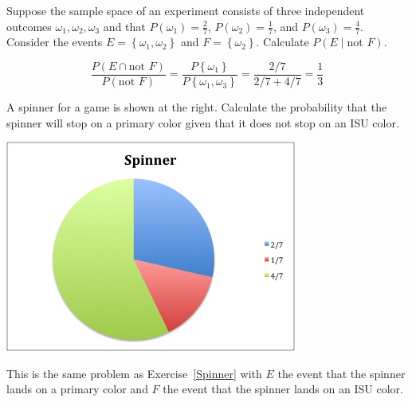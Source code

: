 \documentclass[answers,12pt]{exam}
\begin{document}
\begin{questions}

\question\label{Spinner} Suppose the sample space of an experiment
consists of three independent
outcomes $\omega_1,\omega_2,\omega_3$ and that
$P\left(\omega_1\right)=\frac{2}{7}$, $P\left(\omega_2\right)=\frac{1}{7}$,
and $P\left(\omega_3\right)=\frac{4}{7}$. Consider the events
$E=\left\{\omega_1,\omega_2\right\}$ and $F=\left\{\omega_2\right\}$.
Calculate $P\left(E\mid\text{not $F$}\right)$.
\begin{solution}
\[\frac{P\left(E\cap\text{not $F$}\right)}
{P\left(\text{not $F$}\right)}
=\frac{P\left\{\omega_1\right\}}{P\left\{\omega_1,\omega_3\right\}}
=\frac{2/7}{2/7+4/7}=\frac{1}{3}\]
\end{solution}

\begin{multicols}{2}
\question A spinner for a game is shown at the right.
Calculate the probability that the spinner will stop
on a primary color given that it does not stop on an ISU color.
\begin{center}\includegraphics[scale=.6]{ReviewSpinner}\end{center}
\end{multicols}
\begin{solution} This is the same problem as Exercise~\ref{Spinner}
with $E$ the event that the spinner lands on a primary
color and $F$ the event that the spinner lands on an ISU color.
\end{solution}


\end{questions}
\end{document}
